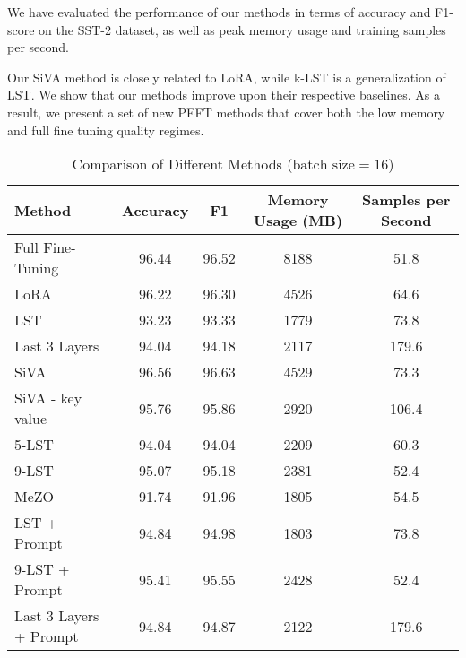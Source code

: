 \vspace{-0.5em}
We have evaluated the performance of our methods in terms of accuracy and F1-score on the SST-2 dataset, as well as peak memory usage and training samples per second.

\vspace{\baselineskip}
Our SiVA method is closely related to LoRA, while k-LST is a generalization of LST. We show that our methods improve upon their respective baselines. As a result, we present a set of new PEFT methods that cover both the low memory and full fine tuning quality regimes.

\begin{table}
  \caption{Comparison of Different Methods ($\text{{batch size}}= 16$)}
  \label{method-comparison}
  \centering
  \begin{tabular}{lcccc}
    \toprule
    Method           & Accuracy & F1    & Memory Usage (MB) & Samples per Second    \\
    \midrule
    Full Fine-Tuning & 96.44    & 96.52 & 8188              & 51.8                  \\
    LoRA             & 96.22    & 96.30 & 4526              & 64.6                  \\
    LST              & 93.23    & 93.33 & 1779              & 73.8                  \\
    Last 3 Layers    & 94.04    & 94.18 & 2117              & 179.6                     \\
    \midrule
    SiVA             & 96.56    & 96.63 & 4529              & 73.3                  \\
    SiVA - key value & 95.76    & 95.86 & 2920              & 106.4                 \\
    \midrule
    5-LST            & 94.04    & 94.04 & 2209              & 60.3                  \\
    9-LST            & 95.07    & 95.18 & 2381              & 52.4                  \\
    \midrule
    MeZO    &   91.74   & 91.96     &   1805    &   54.5
                    \\
    \midrule
    LST + Prompt  & 94.84    & 94.98 & 1803              & 73.8                  \\
    9-LST + Prompt& 95.41    & 95.55 & 2428              & 52.4                  \\
    Last 3 Layers + Prompt & 94.84 & 94.87 & 2122 & 179.6 \\
    \bottomrule
  \end{tabular}
\end{table}

